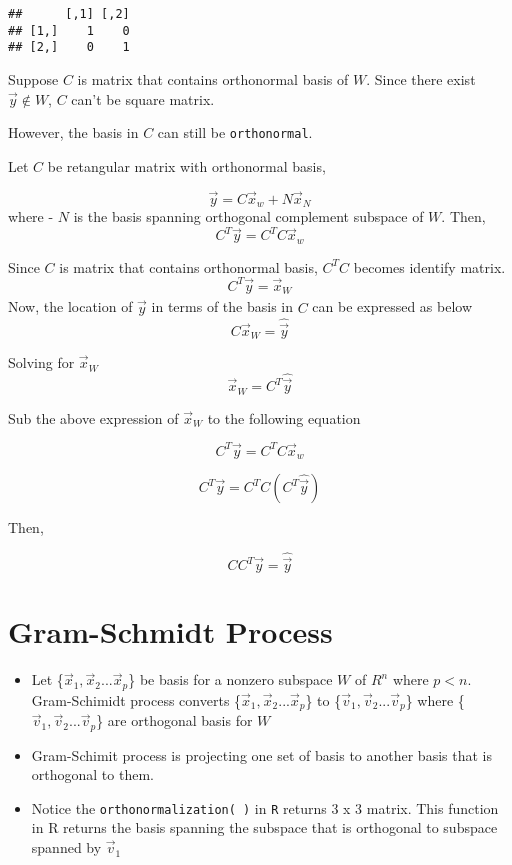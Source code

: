 \documentclass[
]{article}
\begin{document}
\begin{verbatim}
##      [,1] [,2]
## [1,]    1    0
## [2,]    0    1
\end{verbatim}

Suppose \(C\) is matrix that contains orthonormal basis of \(W\). Since
there exist \(\vec{y} \notin W\), \(C\) can't be square matrix.

However, the basis in \(C\) can still be \texttt{orthonormal}.

Let \(C\) be retangular matrix with orthonormal basis,

\[\vec{y} = C\vec{x}_w + N\vec{x}_N\] where - \(N\) is the basis
spanning orthogonal complement subspace of \(W\). Then,
\[C^{T}\vec{y} = C^TC\vec{x}_w\]

Since \(C\) is matrix that contains orthonormal basis, \(C^TC\) becomes
identify matrix. \[C^{T}\vec{y} = \vec{x}_W \] Now, the location of
\(\hat{\vec{y}}\) in terms of the basis in \(C\) can be expressed as
below \[C\vec{x}_W = \hat{\vec{y}}\]

Solving for \(\vec{x}_W\) \[\vec{x}_W = C^T\hat{\vec{y}}\]

Sub the above expression of \(\vec{x}_W\) to the following equation

\[C^{T}\vec{y} = C^TC\vec{x}_w\]

\[C^{T}\vec{y} = C^TC(C^T\hat{\vec{y}})\]

Then,

\[CC^T\vec{y} = \hat{\vec{y}}\]

\hypertarget{gram-schmidt-process}{%
\section{Gram-Schmidt Process}\label{gram-schmidt-process}}

\begin{itemize}
\item
  Let \{\(\vec{x}_1,\vec{x}_2...\vec{x}_p\)\} be basis for a nonzero
  subspace \(W\) of \(R^n\) where \(p < n\). Gram-Schimidt process
  converts \{\(\vec{x}_1,\vec{x}_2...\vec{x}_p\)\} to
  \{\(\vec{v}_1,\vec{v}_2...\vec{v}_p\)\} where
  \{\(\vec{v}_1,\vec{v}_2...\vec{v}_p\)\} are orthogonal basis for \(W\)
\item
  Gram-Schimit process is projecting one set of basis to another basis
  that is orthogonal to them.
\item
  Notice the \texttt{orthonormalization(\ )} in \texttt{R} returns 3 x 3
  matrix. This function in R returns the basis spanning the subspace
  that is orthogonal to subspace spanned by \(\vec{v}_1\)
\end{itemize}
\end{document}
